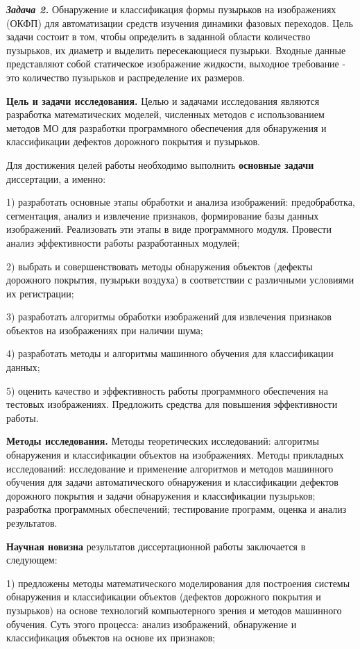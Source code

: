 \textbf{\textit{Задача 2.}} Обнаружение и классификация формы пузырьков на изображениях (ОКФП) для автоматизации средств изучения динамики фазовых переходов. Цель задачи состоит в том, чтобы определить в заданной области количество пузырьков, их диаметр и выделить пересекающиеся пузырьки. Входные данные представляют собой статическое изображение жидкости, выходное требование - это количество пузырьков и распределение их размеров.

\textbf{Цель и задачи исследования.} Целью и задачами исследования являются разработка математических моделей, численных методов с использованием методов МО для разработки программного обеспечения для обнаружения и классификации дефектов дорожного покрытия и пузырьков. 

	Для достижения целей работы необходимо выполнить \textbf{основные задачи} диссертации, а именно:
 
1) разработать основные этапы обработки и анализа изображений: предобработка, сегментация, анализ и извлечение признаков, формирование базы данных изображений. Реализовать эти этапы в виде программного модуля. Провести анализ эффективности работы разработанных модулей;
	
2) выбрать и совершенствовать методы обнаружения объектов (дефекты дорожного покрытия, пузырьки воздуха) в соответствии с различными условиями их регистрации;
	
3) разработать алгоритмы обработки изображений для извлечения признаков объектов на изображениях при наличии шума;
	
4) разработать методы и алгоритмы машинного обучения для классификации данных;
	
5) оценить качество и эффективность работы программного обеспечения на тестовых изображениях. Предложить средства для повышения эффективности работы.
 

\textbf{Методы исследования.} Методы теоретических исследований: алгоритмы обнаружения и классификации объектов на изображениях. Методы прикладных исследований: исследование и применение алгоритмов и методов машинного обучения для  задачи автоматического обнаружения и классификации дефектов дорожного покрытия и задачи обнаружения и классификации пузырьков; разработка программных обеспечений; тестирование программ, оценка и анализ результатов.

\textbf{Научная новизна} результатов диссертационной работы заключается в следующем:

1) предложены методы математического моделирования для построения системы обнаружения и классификации объектов (дефектов дорожного покрытия и пузырьков) на основе технологий компьютерного зрения и методов машинного обучения. Суть этого процесса: анализ изображений, обнаружение и классификация объектов на основе их признаков;

